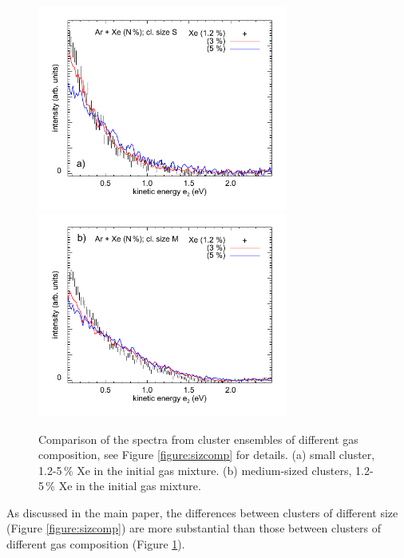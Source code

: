 \documentclass[journal=jpccck,manuscript=suppinfo]{achemso}
\begin{document}
%
%
\begin{figure}
 \centering
 \includegraphics[width=8.2cm]{pics/677_661_cs.pdf}
 \includegraphics[width=8.2cm]{pics/668_653_cs.pdf}
 \caption{
Comparison of the spectra from cluster ensembles of different gas composition, see Figure \protect\ref{figure:sizcomp} for details.
(a) small cluster, 1.2-5\,\% Xe in the initial gas mixture.
(b) medium-sized clusters, 1.2-5\,\% Xe in the initial gas mixture.
 \label{figure:compcomp}
 }
\end{figure}
%
%
As discussed in the main paper, the differences between clusters of different size (Figure \ref{figure:sizcomp}) are more substantial than those between clusters of different gas composition (Figure \ref{figure:compcomp}).



\clearpage



\raggedright

\end{document}
